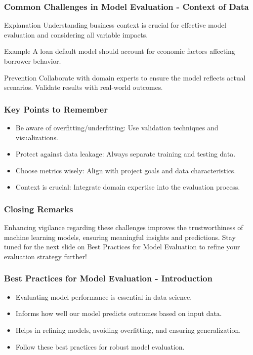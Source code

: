 \documentclass[aspectratio=169]{beamer}
\begin{document}
\begin{frame}[fragile]
    \frametitle{Common Challenges in Model Evaluation - Context of Data}
    \begin{block}{Explanation}
        Understanding business context is crucial for effective model evaluation and considering all variable impacts.
    \end{block}
    
    \begin{block}{Example}
        A loan default model should account for economic factors affecting borrower behavior.
    \end{block}
    
    \begin{block}{Prevention}
        Collaborate with domain experts to ensure the model reflects actual scenarios.
        Validate results with real-world outcomes.
    \end{block}
\end{frame}

\begin{frame}[fragile]
    \frametitle{Key Points to Remember}
    \begin{itemize}
        \item Be aware of overfitting/underfitting: Use validation techniques and visualizations.
        \item Protect against data leakage: Always separate training and testing data.
        \item Choose metrics wisely: Align with project goals and data characteristics.
        \item Context is crucial: Integrate domain expertise into the evaluation process.
    \end{itemize}
\end{frame}

\begin{frame}[fragile]
    \frametitle{Closing Remarks}
    Enhancing vigilance regarding these challenges improves the trustworthiness of machine learning models, ensuring meaningful insights and predictions. 
    Stay tuned for the next slide on Best Practices for Model Evaluation to refine your evaluation strategy further!
\end{frame}

\begin{frame}[fragile]
    \frametitle{Best Practices for Model Evaluation - Introduction}
    \begin{itemize}
        \item Evaluating model performance is essential in data science.
        \item Informs how well our model predicts outcomes based on input data.
        \item Helps in refining models, avoiding overfitting, and ensuring generalization.
        \item Follow these best practices for robust model evaluation.
    \end{itemize}
\end{frame}
\end{document}
